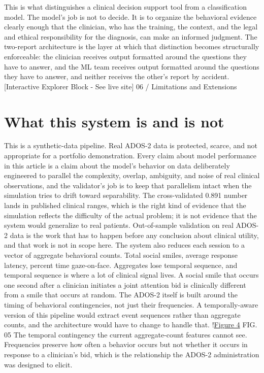 \documentclass{obelus-preprint}
\begin{document}
This is what distinguishes a clinical decision support tool from a classification model. The model's job is not to decide. It is to organize the behavioral evidence clearly enough that the clinician, who has the training, the context, and the legal and ethical responsibility for the diagnosis, can make an informed judgment. The two-report architecture is the layer at which that distinction becomes structurally enforceable: the clinician receives output formatted around the questions they have to answer, and the ML team receives output formatted around the questions they have to answer, and neither receives the other's report by accident.
[Interactive Explorer Block - See live site]
06 / Limitations and Extensions
\section{What this system is and is not}
This is a synthetic-data pipeline. Real ADOS-2 data is protected, scarce, and not appropriate for a portfolio demonstration. Every claim about model performance in this article is a claim about the model's behavior on data deliberately engineered to parallel the complexity, overlap, ambiguity, and noise of real clinical observations, and the validator's job is to keep that parallelism intact when the simulation tries to drift toward separability. The cross-validated 0.891 number lands in published clinical ranges, which is the right kind of evidence that the simulation reflects the difficulty of the actual problem; it is not evidence that the system would generalize to real patients. Out-of-sample validation on real ADOS-2 data is the work that has to happen before any conclusion about clinical utility, and that work is not in scope here.
The system also reduces each session to a vector of aggregate behavioral counts. Total social smiles, average response latency, percent time gaze-on-face. Aggregates lose temporal sequence, and temporal sequence is where a lot of clinical signal lives. A social smile that occurs one second after a clinician initiates a joint attention bid is clinically different from a smile that occurs at random. The ADOS-2 itself is built around the timing of behavioral contingencies, not just their frequencies. A temporally-aware version of this pipeline would extract event sequences rather than aggregate counts, and the architecture would have to change to handle that.
!\href{fig_4.svg}{Figure 4}
FIG. 05 The temporal contingency the current aggregate-count features cannot see. Frequencies preserve how often a behavior occurs but not whether it occurs in response to a clinician's bid, which is the relationship the ADOS-2 administration was designed to elicit.
\end{document}
